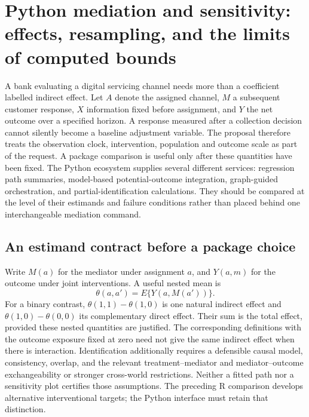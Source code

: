 \section[Python mediation and sensitivity contracts]{Python mediation and sensitivity: effects, resampling, and the limits of computed bounds}
\label{sec:exec25-pymed}

A bank evaluating a digital servicing channel needs more than a coefficient labelled indirect effect. Let $A$ denote the assigned channel, $M$ a subsequent customer response, $X$ information fixed before assignment, and $Y$ the net outcome over a specified horizon. A response measured after a collection decision cannot silently become a baseline adjustment variable. The proposal therefore treats the observation clock, intervention, population and outcome scale as part of the request. A package comparison is useful only after these quantities have been fixed. The Python ecosystem supplies several different services: regression path summaries, model-based potential-outcome integration, graph-guided orchestration, and partial-identification calculations. They should be compared at the level of their estimands and failure conditions rather than placed behind one interchangeable mediation command.\cite{exec25_pymed_statsmodels,exec25_pymed_pingouin,exec25_pymed_dowhy,exec25_pymed_process,exec25_pymed_choice}

\subsection{An estimand contract before a package choice}
Write $M(a)$ for the mediator under assignment $a$, and $Y(a,m)$ for the outcome under joint interventions. A useful nested mean is
\[
 \theta(a,a')=E\{Y(a,M(a'))\}.
\]
For a binary contrast, $\theta(1,1)-\theta(1,0)$ is one natural indirect effect and $\theta(1,0)-\theta(0,0)$ its complementary direct effect. Their sum is the total effect, provided these nested quantities are justified. The corresponding definitions with the outcome exposure fixed at zero need not give the same indirect effect when there is interaction. Identification additionally requires a defensible causal model, consistency, overlap, and the relevant treatment--mediator and mediator--outcome exchangeability or stronger cross-world restrictions. Neither a fitted path nor a sensitivity plot certifies those assumptions. The preceding R comparison develops alternative interventional targets; the Python interface must retain that distinction.\cite{exec25_pymed_choice,exec25_pymed_sharp_paper}

